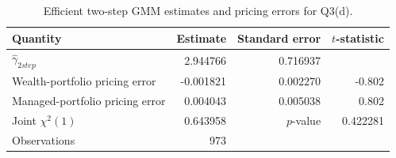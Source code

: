 \begin{table}[htbp]
\centering
\caption{Efficient two-step GMM estimates and pricing errors for Q3(d).}
\label{tab:q3d-results}
\begin{tabular}{lrrr}
\hline
Quantity & Estimate & Standard error & $t$-statistic \\
\hline
$\widehat{\gamma}_{2step}$ & 2.944766 & 0.716937 & \\
Wealth-portfolio pricing error & -0.001821 & 0.002270 & -0.802 \\
Managed-portfolio pricing error & 0.004043 & 0.005038 & 0.802 \\
\hline
Joint $\chi^2(1)$ & 0.643958 & $p$-value & 0.422281 \\
Observations & 973 & & \\
\hline
\end{tabular}
\end{table}
